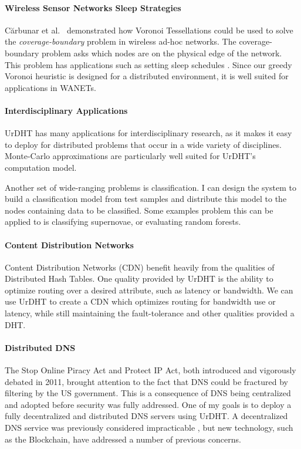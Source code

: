 \documentclass[letterpaper]{article}
\begin{document}

\paragraph*{Wireless Sensor Networks Sleep Strategies} C\u{a}rbunar et al.\ \cite{carbunar2004distributed} demonstrated how Voronoi Tessellations could be used to solve the \textit{coverage-boundary} problem in wireless ad-hoc networks.
The coverage-boundary problem asks which nodes are on the physical edge of the network.
This problem  has applications such as setting sleep schedules \cite{chen2008voronoi}.
Since our greedy Voronoi heuristic is designed for a distributed environment, it is well suited for applications in WANETs. 


\paragraph*{Interdisciplinary Applications}
UrDHT has many applications for interdisciplinary research, as it makes it easy to deploy for distributed problems that occur in a wide variety of disciplines.
Monte-Carlo approximations are particularly well suited for UrDHT's computation model.

Another set of wide-ranging problems is classification.  
I can design the system to build a classification model from test samples and distribute this model to the nodes containing data to be classified.
Some examples problem this can be applied to is classifying supernovae, or evaluating random forests.


\paragraph*{Content Distribution Networks}
Content Distribution Networks (CDN) benefit heavily from the qualities of Distributed Hash Tables.
One quality provided by UrDHT is the ability to optimize routing over a desired attribute, such as latency or bandwidth.
We can use UrDHT to create a CDN which optimizes routing for bandwidth use or latency, while still maintaining the fault-tolerance and other qualities provided a DHT.


\paragraph*{Distributed DNS}
The Stop Online Piracy Act and Protect IP Act, both introduced and vigorously debated in 2011, brought attention to the fact that DNS could be fractured by filtering by the US government.
This is a consequence of DNS being centralized  and adopted before security was fully addressed.
One of my goals is to deploy a fully decentralized and distributed DNS servers using UrDHT.
A decentralized DNS service was previously considered impracticable \cite{cox2002serving}, but new technology, such as the Blockchain, have addressed a number of previous concerns.
\end{document}
